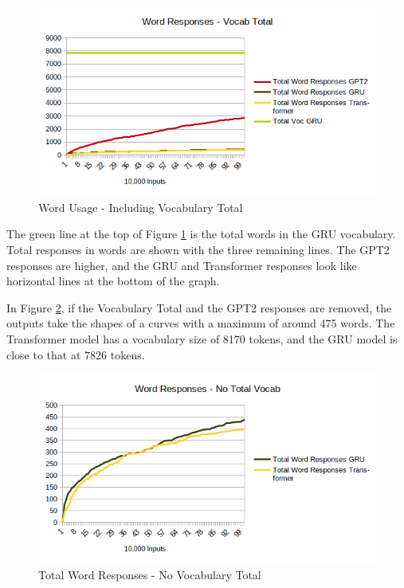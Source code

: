 \begin{figure}[H]
	\begin{center}
		\includegraphics[scale=0.75]{diagram-output-total-responses-01}
		
		
	\end{center}
	\caption[Word Usage]{Word Usage - Including Vocabulary Total}
	\label{diagram-words-with-voc-total}
	
\end{figure}

The green line at the top of Figure \ref{diagram-words-with-voc-total} is the total words in the GRU vocabulary. %
Total responses in words are shown with the three remaining lines. The GPT2 responses are higher, and the GRU and Transformer responses look like horizontal lines at the bottom of the graph.

In Figure \ref{diagram-words-no-voc-total}, if the Vocabulary Total and the GPT2 responses are removed, the outputs take the shapes of a curves with a maximum of around 475 words. The Transformer model has a vocabulary size of 8170 tokens, and the GRU model is close to that at 7826 tokens. %


\begin{figure}[H]
	\begin{center}
		\includegraphics[scale=0.75]{diagram-output-total-responses-02}
		
		
	\end{center}
	\caption[Total Word Responses]{Total Word Responses - No Vocabulary Total}
	\label{diagram-words-no-voc-total}
	
\end{figure}

